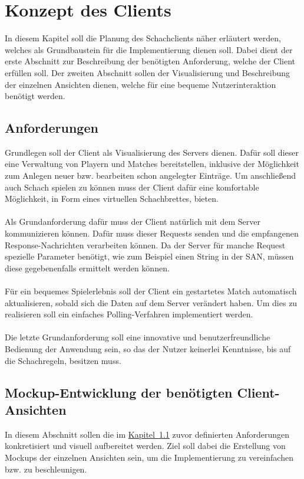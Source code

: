 
\chapter{Konzept des Clients}\label{sec:conceptClient}
In diesem Kapitel soll die Planung des Schachclients näher erläutert werden, welches als Grundbaustein für die Implementierung dienen soll. Dabei dient der erste Abschnitt zur Beschreibung der benötigten Anforderung, welche der Client erfüllen soll. Der zweiten Abschnitt sollen der Visualisierung und Beschreibung der einzelnen Ansichten dienen, welche für eine bequeme Nutzerinteraktion benötigt werden.

\section{Anforderungen}\label{sec:anforderungenClient}
Grundlegen soll der Client als Visualisierung des Servers dienen. Dafür soll dieser eine Verwaltung von Playern und Matches bereitstellen, inklusive der Möglichkeit zum Anlegen neuer bzw. bearbeiten schon angelegter Einträge. Um anschließend auch Schach spielen zu können muss der Client dafür eine komfortable Möglichkeit, in Form eines virtuellen Schachbrettes, bieten.\\
\\
Als Grundanforderung dafür muss der Client natürlich mit dem Server kommunizieren können. Dafür muss dieser Requests senden und die empfangenen Response-Nachrichten verarbeiten können. Da der Server für manche Request spezielle Parameter benötigt, wie zum Beispiel einen String in der \gls{SAN}, müssen diese gegebenenfalls ermittelt werden können.\\
\\
Für ein bequemes Spielerlebnis soll der Client ein gestartetes Match automatisch aktualisieren, sobald sich die Daten auf dem Server verändert haben. Um dies zu realisieren soll ein einfaches Polling-Verfahren implementiert werden.\\
\\ 
Die letzte Grundanforderung soll eine innovative und benutzerfreundliche Bedienung der Anwendung sein, so das der Nutzer keinerlei Kenntnisse, bis auf die Schachregeln, besitzen muss.

\section{Mockup-Entwicklung der benötigten Client-Ansichten}\label{sec:views}
In diesem Abschnitt sollen die im \hyperref[sec:anforderungenClient]{Kapitel~\ref{sec:anforderungenClient}} zuvor definierten Anforderungen konkretisiert und visuell aufbereitet werden. Ziel soll dabei die Erstellung von Mockups der einzelnen Ansichten sein, um die Implementierung zu vereinfachen bzw. zu beschleunigen.

